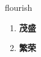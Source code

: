 
\begin{frame}
{\huge flourish}
\begin{center}
\begin{enumerate}\Large
  \item \textbf{茂盛}
  \item \textbf{繁荣}
\end{enumerate}
\end{center}
\end{frame}

